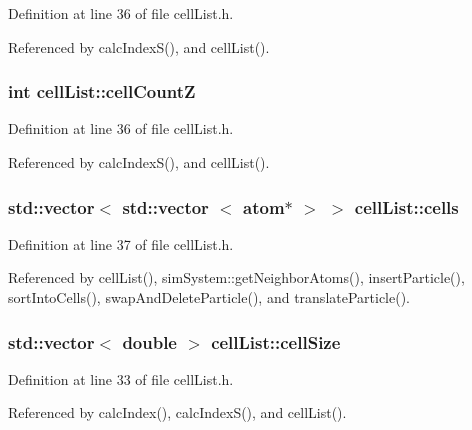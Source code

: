 Definition at line 36 of file cell\-List.\-h.



Referenced by calc\-Index\-S(), and cell\-List().

\hypertarget{classcell_list_a2b506715c6ded7cb9fadf994f4f01785}{
\subsubsection[{cell\-Count\-Z}]{\setlength{\rightskip}{0pt plus 5cm}int cell\-List\-::cell\-Count\-Z}}\label{classcell_list_a2b506715c6ded7cb9fadf994f4f01785}


Definition at line 36 of file cell\-List.\-h.



Referenced by calc\-Index\-S(), and cell\-List().

\hypertarget{classcell_list_a10bc0c3ae819293b1e88bc7d1bfdb2aa}{
\subsubsection[{cells}]{\setlength{\rightskip}{0pt plus 5cm}std\-::vector$<$ std\-::vector $<$ {\bf atom}$\ast$ $>$ $>$ cell\-List\-::cells}}\label{classcell_list_a10bc0c3ae819293b1e88bc7d1bfdb2aa}


Definition at line 37 of file cell\-List.\-h.



Referenced by cell\-List(), sim\-System\-::get\-Neighbor\-Atoms(), insert\-Particle(), sort\-Into\-Cells(), swap\-And\-Delete\-Particle(), and translate\-Particle().

\hypertarget{classcell_list_ac920f36bcf43f79ab853921bb0b7c2f4}{
\subsubsection[{cell\-Size}]{\setlength{\rightskip}{0pt plus 5cm}std\-::vector$<$ double $>$ cell\-List\-::cell\-Size}}\label{classcell_list_ac920f36bcf43f79ab853921bb0b7c2f4}


Definition at line 33 of file cell\-List.\-h.



Referenced by calc\-Index(), calc\-Index\-S(), and cell\-List().

